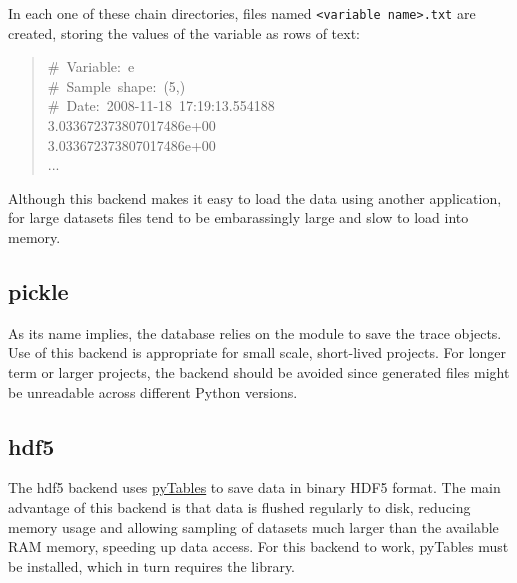 In each one of these chain directories, files named \texttt{<variable name>.txt}
are created, storing the values of the variable as rows of text:
\begin{quote}{\ttfamily \raggedright \noindent
{\#}~Variable:~e~\\
{\#}~Sample~shape:~(5,)~\\
{\#}~Date:~2008-11-18~17:19:13.554188~\\
3.033672373807017486e+00~\\
3.033672373807017486e+00~\\
...
}\end{quote}

Although this backend makes it easy to load the data using another application,
for large datasets files tend to be embarassingly large and slow to load
into memory.



\hypertarget{pickle}{}
\subsection*{pickle}
\label{pickle}

As its name implies, the  database relies on the  module to save the trace objects. Use of this backend is appropriate for small scale, short-lived projects. For longer term or larger projects, the  backend should be avoided since generated files might be unreadable across different Python versions.



\hypertarget{hdf5}{}
\subsection*{hdf5}
\label{hdf5}

The hdf5 backend uses \href{http://www.pytables.org/moin}{pyTables} to save data in binary HDF5 format. The main advantage of this backend is that data is flushed regularly to disk, reducing memory usage and allowing sampling of datasets much larger than the available RAM memory, speeding up data access. For this backend to work, pyTables must be installed, which in turn requires the  library.




